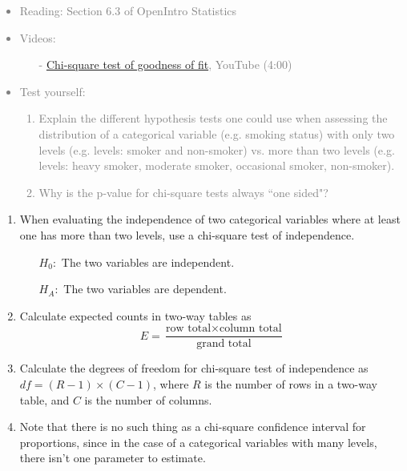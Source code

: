 \documentclass[11pt]{article}
\newcommand{\gray}[1]{\textcolor{gray}{#1}}
\begin{document}
\gray{
{\it
\vspace{-0.55cm}
\begin{itemize}
\renewcommand{\labelitemi}{{\textcolor{dark}{$\ast$}}}
\item Reading: Section 6.3 of OpenIntro Statistics
\item Videos:
\begin{itemize}
\item[-] \href{http://www.youtube.com/watch?v=b3o_hjWKgQw}{Chi-square test of goodness of fit}, YouTube (4:00)
\end{itemize}
\item Test yourself:
\begin{enumerate}
\item Explain the different hypothesis tests one could use when assessing the distribution of a categorical variable (e.g. smoking status) with only two levels (e.g. levels: smoker and non-smoker) vs. more than two levels (e.g. levels: heavy smoker, moderate smoker, occasional smoker, non-smoker).
\item Why is the p-value for chi-square tests always ``one sided"?
\end{enumerate}
\end{itemize}
}}

%

\begin{enumerate}[resume]
\renewcommand\labelenumi{\textcolor{light}{\textbf{LO \theenumi.}}}

\item When evaluating the independence of two categorical variables where at least one has more than two levels, use a chi-square test of independence.
\begin{itemize}
\item[] $H_0:$ The two variables are independent.
\item[] $H_A:$ The two variables are dependent.
\end{itemize}

\item Calculate expected counts in two-way tables as 
\[ E = \frac{\text{row total} \times \text{column total}}{\text{grand total}} \]

\item Calculate the degrees of freedom for chi-square test of independence as $df = (R - 1) \times (C - 1)$, where $R$ is the number of rows in a two-way table, and $C$ is the number of columns.

\item Note that there is no such thing as a chi-square confidence interval for proportions, since in the case of a categorical variables with many levels, there isn't one parameter to estimate.

\end{enumerate}
\end{document}
